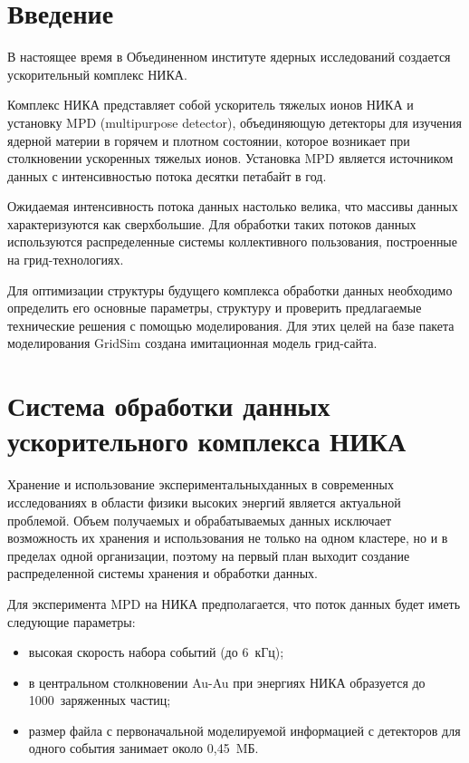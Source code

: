       \begin{multicols}{2}

            \label{st\stat}


\section{Введение}

   В настоящее время в Объединенном институте ядерных исследований 
создается ускорительный комплекс НИКА. 

Комплекс НИКА представляет 
собой ускоритель тяжелых ионов НИКА и установку MPD (multipurpose 
detector), объединяющую детекторы для изучения ядерной материи в горячем и 
плотном состоянии, которое возникает при столкновении ускоренных тяжелых 
ионов. Установка MPD является источником данных с интенсивностью потока десятки 
петабайт в год. 
   
   Ожидаемая интенсивность потока данных настолько велика, что массивы 
данных характеризуются как сверхбольшие. Для обработки таких потоков 
данных используются распределенные системы коллективного пользования, 
построенные на грид-тех\-но\-ло\-гиях.
   
   Для оптимизации структуры будущего комплекса обработки данных 
необходимо определить его основные параметры, структуру и проверить 
предлагаемые технические решения с помощью моделирования. Для этих целей 
на базе пакета моделирования GridSim создана имитационная модель грид-сайта.

\vspace*{-6pt}

\section{Система обработки данных ускорительного комплекса 
НИКА}

\vspace*{-2pt}

   Хранение и использование экспериментальных\linebreak данных в современных 
исследованиях в об\-ласти физики высоких энергий является актуальной 
проб\-ле\-мой. Объем получаемых и обрабатываемых данных исключает 
возможность их хранения и использования не только на одном кластере, но и в 
пределах одной организации, поэтому на первый план выходит создание 
распределенной системы хранения и обработки данных.
   
   Для эксперимента MPD на НИКА предполагается, что поток данных будет 
иметь следующие параметры:
   \begin{itemize}
\item высокая скорость набора событий (до 6~кГц);
\item в центральном столкновении Au-Au при энергиях НИКА 
образуется до 1000~заряженных час\-тиц;
\item размер файла с первоначальной моделируемой информацией с 
детекторов для одного события занимает около 0,45~MБ.
\end{itemize}

\end{multicols}

